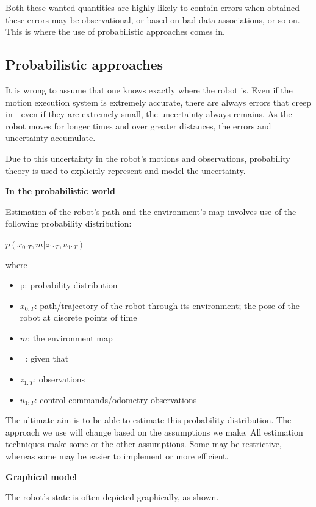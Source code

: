 \documentclass[a4paper]{article}
\begin{document}
Both these wanted quantities are highly likely to contain errors when obtained - these errors may be observational, or based on bad data associations, or so on. This is where the use of probabilistic approaches comes in.

\subsection{Probabilistic approaches}

It is wrong to assume that one knows exactly where the robot is. Even if the motion execution system is extremely accurate, there are always errors that creep in - even if they are extremely small, the uncertainty always remains. As the robot moves for longer times and over greater distances, the errors and uncertainty accumulate.

Due to this uncertainty in the robot's motions and observations, probability theory is used to explicitly represent and model the uncertainty.

\textbf{In the probabilistic world}

Estimation of the robot's path and the environment's map involves use of the following probability distribution:

$p(x_{0:T},m|z_{1:T},u_{1:T})$

where
\begin{itemize}
    \item p: probability distribution
    \item $x_{0:T}$: path/trajectory of the robot through its environment; the pose of the robot at discrete points of time
    \item $m$: the environment map
    \item $|$ : given that
    \item $z_{1:T}$: observations
    \item $u_{1:T}$: control commands/odometry observations
\end{itemize}

The ultimate aim is to be able to estimate this probability distribution. The approach we use will change based on the assumptions we make. All estimation techniques make some or the other assumptions. Some may be restrictive, whereas some may be easier to implement or more efficient.

\textbf{Graphical model}

The robot's state is often depicted graphically, as shown.
\end{document}
